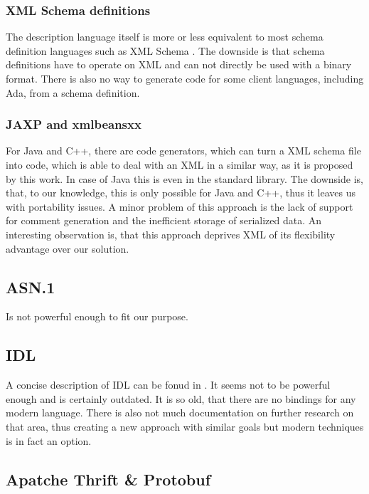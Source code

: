 \subsubsection*{XML Schema definitions}

The description language itself is more or less equivalent to most schema definition languages such as XML Schema . The downside is that schema definitions have to operate on XML and can not directly be used with a binary format. There is also
no way to generate code for some client languages, including Ada, from a schema definition.

\subsubsection*{JAXP and xmlbeansxx}

For Java and C++, there are code generators, which can turn a XML schema file into code, which is able to deal with an XML in a similar way, as it is proposed by this work. In case of Java this is even in the standard library. The downside is, that, to our knowledge, this is only possible for Java and C++, thus it leaves us with portability issues. A minor problem of this approach is the lack of support for comment generation and the inefficient storage of serialized data.
An interesting observation is, that this approach deprives XML of its flexibility advantage over our solution. 


\subsection*{ASN.1}

Is not powerful enough to fit our purpose.

\subsection*{IDL}

A concise description of IDL can be fonud in . It seems not to be powerful enough and is certainly outdated. It is so old, that there are no bindings for any modern language. There is also not much documentation on further research on that area, thus creating a new approach with similar goals but modern techniques is in fact an option.


\subsection*{Apatche Thrift \& Protobuf}

